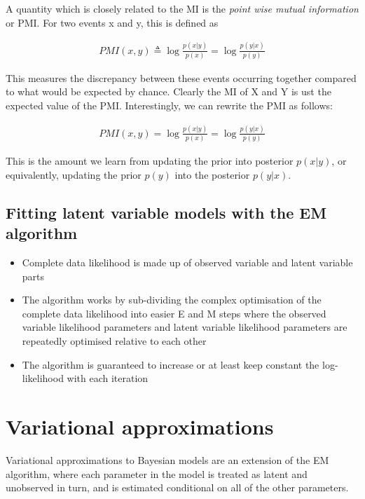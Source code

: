 \documentclass{amsart}
\begin{document}
A quantity which is closely related to the MI is the \emph{point wise mutual information}
or PMI. For two events x and y, this is defined as

\begin{align*}
	PMI(x, y) \triangleq \log{\frac{p(x|y)}{p(x)}} = \log{\frac{p(y|x)}{p(y)}}
\end{align*}

This measures the discrepancy between these events occurring together compared to what
would be expected by chance. Clearly the MI of X and Y is ust the expected value
of the PMI. Interestingly, we can rewrite the PMI as follows:

\begin{align*}
	PMI(x, y) = \log{\frac{p(x|y)}{p(x)}} = \log{\frac{p(y|x)}{p(y)}}
\end{align*}

This is the amount we learn from updating the prior into posterior $p(x|y)$, or
equivalently, updating the prior $p(y)$ into the posterior $p(y|x)$.

\subsection{Fitting latent variable models with the EM algorithm}
\begin{itemize}
\item Complete data likelihood is made up of observed variable and latent variable parts
\item The algorithm works by sub-dividing the complex optimisation of the complete data
likelihood into easier E and M steps where the observed variable likelihood parameters 
and latent variable likelihood parameters are repeatedly optimised relative to each 
other
\item The algorithm is guaranteed to increase or at least keep constant the log-
likelihood with each iteration
\end{itemize}

\section{Variational approximations}
Variational approximations to Bayesian models are an extension of the EM algorithm,
where each parameter in the model is treated as latent and unobserved in turn, and is
estimated conditional on all of the other parameters.



\end{document}
